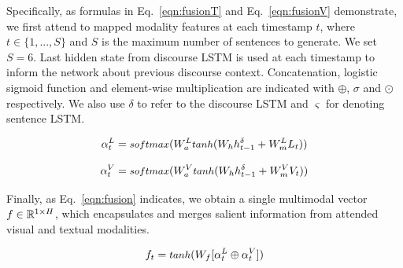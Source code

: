 \documentclass[11pt,a4paper]{article}
\newcommand{\R}{\mathbb{R}}
\begin{document}
Specifically, as formulas in Eq.~\ref{eqn:fusionT} and Eq.~\ref{eqn:fusionV} demonstrate, we first attend to mapped modality features at each timestamp $t$, where $t \in \{1, ..., S\}$ and $S$ is the maximum number of sentences to generate.
We set $S=6$.
Last hidden state from discourse LSTM is used at each timestamp to inform the network about previous discourse context.
Concatenation, logistic sigmoid function and element-wise multiplication are indicated with $\oplus$, $\sigma$ and $\odot$ respectively.
We also use $\delta$ to refer to the discourse LSTM and $\varsigma$ for denoting sentence LSTM.

\begin{equation}
  \alpha_t\sp{L} = \text{\small $softmax$}( W_a\sp{L} \text{\small $tanh$} (W_h h\sp{\delta}_{t-1} + W_{m}\sp{L} L_t) )
\label{eqn:fusionT}
\end{equation}

\begin{equation}
  \alpha_t\sp{V} = \text{\small $softmax$}( W_a\sp{V} \text{\small $tanh$} (W_h h\sp{\delta}_{t-1} + W_{m}\sp{V} V_t) )
\label{eqn:fusionV}
\end{equation}

Finally, as Eq.~\ref{eqn:fusion} indicates, we obtain a single multimodal vector $f \in \R\sp{1 \times H}$, which encapsulates and merges salient information from attended visual and textual modalities.

\begin{equation}
	f_t = \text{\small $tanh$} (W_f [ \alpha_t\sp{L} \oplus \alpha_t\sp{V} ] )
\label{eqn:fusion}
\end{equation}

\end{document}
